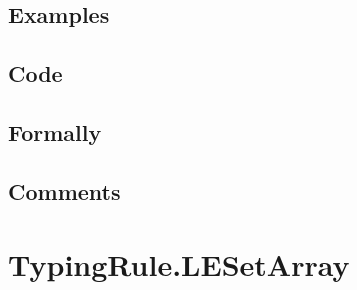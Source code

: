 \documentclass{book}
\begin{document}
  \subsection{Examples}

  \subsection{Code}

  \subsection{Formally}

  \subsection{Comments}

\section{TypingRule.LESetArray \label{sec:TypingRule.LESetArray}}
\end{document}
